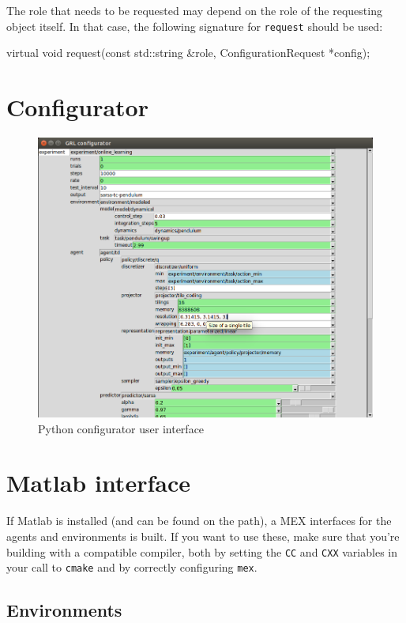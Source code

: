 \documentclass{article}
\newcommand{\txt}[1]{\texttt{#1}}
\newenvironment{code}{\alltt}{\endalltt}
\begin{document}
The role that needs to be requested may depend on the role of the requesting
object itself. In that case, the following signature for \txt{request}
should be used:

\begin{code}
virtual void request(const std::string \&role, ConfigurationRequest *config);
\end{code}

\section{Configurator}

\begin{figure}[H]
\includegraphics[width=\linewidth]{grl.png}
\caption{Python configurator user interface}
\label{fig:conf}
\end{figure}

\section{Matlab interface}

If Matlab is installed (and can be found on the path), a MEX interfaces for
the agents and environments is built. If you want to use these, make sure
that you're building with a compatible compiler, both by setting the
\txt{CC} and \txt{CXX} variables in your call to \txt{cmake} and by correctly
configuring \txt{mex}.

\subsection{Environments}
\end{document}
